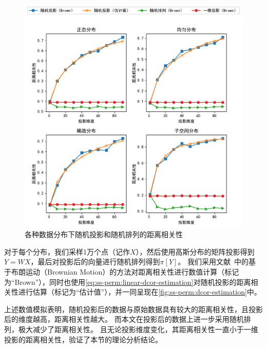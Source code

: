 \begin{figure}[h!]
    \centering
    \includegraphics[width=\linewidth]{Z_Resources/ss-perm_dcor-estimation}
    \caption{各种数据分布下随机投影和随机排列的距离相关性}
    \label{fig:ss-perm:dcor-estimation}
\end{figure}


对于每个分布，我们采样1万个点（记作$X$），然后使用高斯分布的矩阵投影得到$Y = WX$，最后对投影后的向量进行随机排列得到$\pi[Y]$。
%
我们采用文献~\cite{szekely2009brownian_dcor}中的基于布朗运动（Brownian Motion）的方法对距离相关性进行数值计算（标记为“Brown”），同时也使用\autoref{eq:ss-perm:linear-dcor-estimation}对随机投影的距离相关性进行估算（标记为“估计值”），并一同呈现在\autoref{fig:ss-perm:dcor-estimation}中。
%


上述数值模拟表明，随机投影后的数据与原始数据具有较大的距离相关性，且投影后的维度越高，距离相关性越大。
%
而本文在投影后的数据上进一步采用随机排列，极大减少了距离相关性。
且无论投影维度变化，其距离相关性一直小于一维投影的距离相关性，验证了本节的理论分析结论。